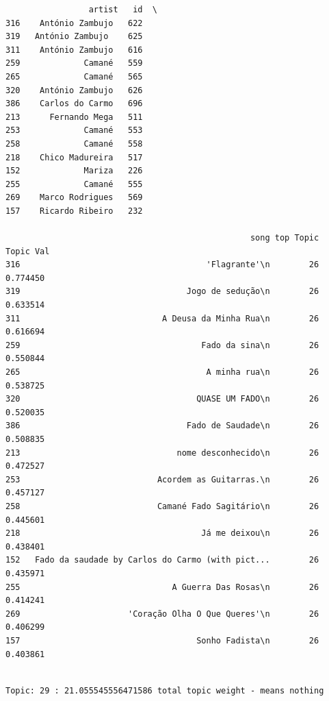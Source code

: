 \documentclass[11pt]{article}
\begin{document}
    
    \begin{verbatim}
                 artist   id  \
316    António Zambujo   622   
319   António Zambujo    625   
311    António Zambujo   616   
259             Camané   559   
265             Camané   565   
320    António Zambujo   626   
386    Carlos do Carmo   696   
213      Fernando Mega   511   
253             Camané   553   
258             Camané   558   
218    Chico Madureira   517   
152             Mariza   226   
255             Camané   555   
269    Marco Rodrigues   569   
157    Ricardo Ribeiro   232   

                                                  song top Topic  Topic Val  
316                                      'Flagrante'\n        26   0.774450  
319                                  Jogo de sedução\n        26   0.633514  
311                             A Deusa da Minha Rua\n        26   0.616694  
259                                     Fado da sina\n        26   0.550844  
265                                      A minha rua\n        26   0.538725  
320                                    QUASE UM FADO\n        26   0.520035  
386                                  Fado de Saudade\n        26   0.508835  
213                                nome desconhecido\n        26   0.472527  
253                            Acordem as Guitarras.\n        26   0.457127  
258                            Camané Fado Sagitário\n        26   0.445601  
218                                     Já me deixou\n        26   0.438401  
152   Fado da saudade by Carlos do Carmo (with pict...        26   0.435971  
255                               A Guerra Das Rosas\n        26   0.414241  
269                      'Coração Olha O Que Queres'\n        26   0.406299  
157                                    Sonho Fadista\n        26   0.403861  
    \end{verbatim}

    
    \begin{Verbatim}[commandchars=\\\{\}]

Topic: 29 : 21.055545556471586 total topic weight - means nothing

    \end{Verbatim}
\end{document}

